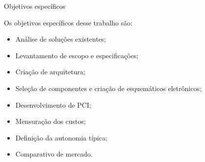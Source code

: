 \begin{frame}{Objetivos específicos}

Os objetivos específicos desse trabalho são:
    
\begin{itemize}
    \item Análise de soluções existentes;
    \item Levantamento de escopo e especificações;
    \item Criação de arquitetura;
    \item Seleção de componentes e criação de esquemáticos eletrônicos;
    \item Desenvolvimento de PCI;
    \item Mensuração dos custos;
    \item Definição da autonomia típica;
    \item Comparativo de mercado.
\end{itemize}
    
    
\end{frame}

